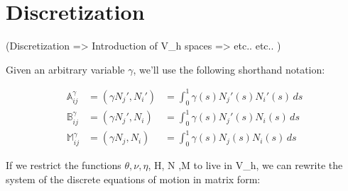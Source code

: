 

\section{Discretization}\label{matrix-form-of-the-weak-formulation}

(Discretization => Introduction of V_h spaces => etc.. etc.. )

Given an arbitrary variable $\gamma$, we’ll use the following shorthand notation:

\begin{equation}
  \label{eq:2}
  \begin{aligned}
   \mathbb{A}^\gamma_{ij} & = (\gamma N_j', N_i') &  = \int_0^1 \gamma(s) N_j'(s)
    N_i'(s) \, ds \\
     \mathbb{B}^\gamma_{ij} & = (\gamma N_j', N_i) & = \int_0^1 \gamma(s) N_j'(s)
    N_i(s) \, ds \\
     \mathbb{M}^\gamma_{ij} & = (\gamma N_j, N_i) & = \int_0^1 \gamma(s) N_j(s)
    N_i(s) \, ds 
  \end{aligned}
\end{equation}

If we restrict the functions $\theta, \nu, \eta$, H, N ,M to live in V_h, we
can rewrite the system of the discrete equations of motion in matrix form:

